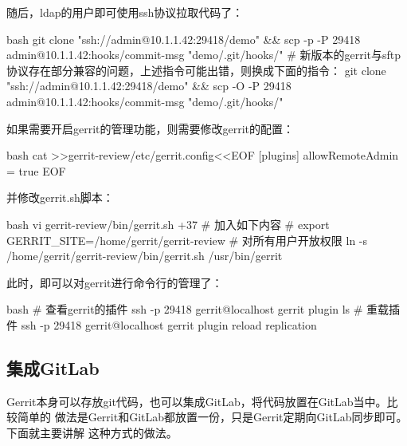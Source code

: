 随后，ldap的用户即可使用ssh协议拉取代码了：
\begin{code-block}{bash}
git clone "ssh://admin@10.1.1.42:29418/demo" && scp -p -P 29418 admin@10.1.1.42:hooks/commit-msg "demo/.git/hooks/"
# 新版本的gerrit与sftp协议存在部分兼容的问题，上述指令可能出错，则换成下面的指令：
git clone "ssh://admin@10.1.1.42:29418/demo" && scp -O -P 29418 admin@10.1.1.42:hooks/commit-msg "demo/.git/hooks/"
\end{code-block}

如果需要开启gerrit的管理功能，则需要修改gerrit的配置：
\begin{code-block}{bash}
cat >>gerrit-review/etc/gerrit.config<<EOF
[plugins]
        allowRemoteAdmin = true
EOF
\end{code-block}
并修改gerrit.sh脚本：
\begin{code-block}{bash}
vi gerrit-review/bin/gerrit.sh +37
# 加入如下内容
# export GERRIT_SITE=/home/gerrit/gerrit-review
# 对所有用户开放权限
ln -s /home/gerrit/gerrit-review/bin/gerrit.sh /usr/bin/gerrit
\end{code-block}

此时，即可以对gerrit进行命令行的管理了：
\begin{code-block}{bash}
# 查看gerrit的插件
ssh -p 29418 gerrit@localhost gerrit plugin ls
# 重载插件
ssh -p 29418 gerrit@localhost gerrit plugin reload replication
\end{code-block}

\subsection{集成GitLab}
Gerrit本身可以存放git代码，也可以集成GitLab，将代码放置在GitLab当中。比较简单的
做法是Gerrit和GitLab都放置一份，只是Gerrit定期向GitLab同步即可。下面就主要讲解
这种方式的做法。

